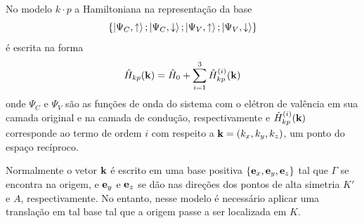 No modelo $ k \cdot p $ a Hamiltoniana na representação da base
\begin{equation}
  \left\{ \ket{\Psi_C,\uparrow} ; \ket{\Psi_C,\downarrow} ; \ket{\Psi_V,\uparrow} ; \ket{\Psi_V,\downarrow} \right\}
  \label{eq:basis}
\end{equation}
é escrita na forma
\begin{equation}
  \hat{H}_{kp}(\mathbf{k}) = \hat{H}_0 + \sum_{i=1}^3 \hat{H}_{kp}^{(i)}(\mathbf{k})
  \label{eq:total_ham}
\end{equation}
onde $ \Psi_C $ e $ \Psi_V $ são as funções de onda do sistema com o elétron de
valência em sua camada original e na camada de condução, respectivamente e 
$ \hat{H}_{kp}^{(i)}(\mathbf{k}) $ corresponde ao termo de ordem $ i $ com respeito
a $ \mathbf{k} = (k_x, k_y, k_z) $, um ponto do espaço recíproco. 

Normalmente o vetor $ \mathbf{k} $ é escrito em uma base positiva 
$ \{\mathbf{e}_x,\mathbf{e}_y,\mathbf{e}_z\} $ tal que $\Gamma$ se encontra na origem, e
$ \mathbf{e}_y $ e $ \mathbf{e}_z $ se dão nas direções dos pontos de alta simetria
$K'$ e $A$, respectivamente. No entanto, nesse modelo é necessário aplicar uma
translação em tal base tal que a origem passe a ser localizada em $K$.

